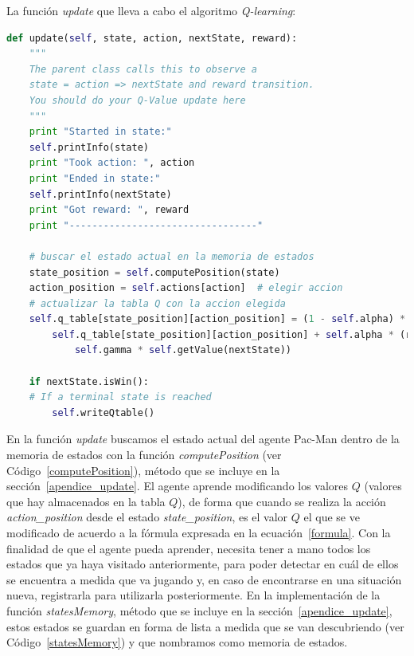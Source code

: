 \documentclass[11pt]{exam}
\begin{document}
La función \textit{update} que lleva a cabo el algoritmo \textit{Q-learning}:
\vspace*{3mm}

\begin{lstlisting}[caption={Función update.}, label={update}, language=python, basicstyle=\footnotesize]
def update(self, state, action, nextState, reward):
	"""
	The parent class calls this to observe a
	state = action => nextState and reward transition.
	You should do your Q-Value update here
	"""	
	print "Started in state:"
	self.printInfo(state)
	print "Took action: ", action
	print "Ended in state:"
	self.printInfo(nextState)
	print "Got reward: ", reward
	print "---------------------------------"

	# buscar el estado actual en la memoria de estados
	state_position = self.computePosition(state)
	action_position = self.actions[action]  # elegir accion
	# actualizar la tabla Q con la accion elegida
	self.q_table[state_position][action_position] = (1 - self.alpha) * 
		self.q_table[state_position][action_position] + self.alpha * (reward + 
			self.gamma * self.getValue(nextState))

	if nextState.isWin():
	# If a terminal state is reached
		self.writeQtable()
\end{lstlisting}

En la función \textit{update} buscamos el estado actual del agente Pac-Man dentro de la memoria de estados con la función \textit{computePosition} (ver Código~\ref{computePosition}), método que se incluye en la sección~\ref{apendice_update}. El agente aprende modificando los valores $Q$ (valores que hay almacenados en la tabla $Q$), de forma que cuando se realiza la acción \textit{action\_position} desde el estado \textit{state\_position}, es el valor $Q$ el que se ve modificado de acuerdo a la fórmula expresada en la ecuación~\ref{formula}. Con la finalidad de que el agente pueda aprender, necesita tener a mano todos los estados que ya haya visitado anteriormente, para poder detectar en cuál de ellos se encuentra a medida que va jugando y, en caso de encontrarse en una situación nueva, registrarla para utilizarla posteriormente. En la implementación de la función \textit{statesMemory}, método que se incluye en la sección~\ref{apendice_update}, estos estados se guardan en forma de lista a medida que se van descubriendo (ver Código~\ref{statesMemory}) y que nombramos como memoria de estados.
\vspace*{3mm}
\end{document}
